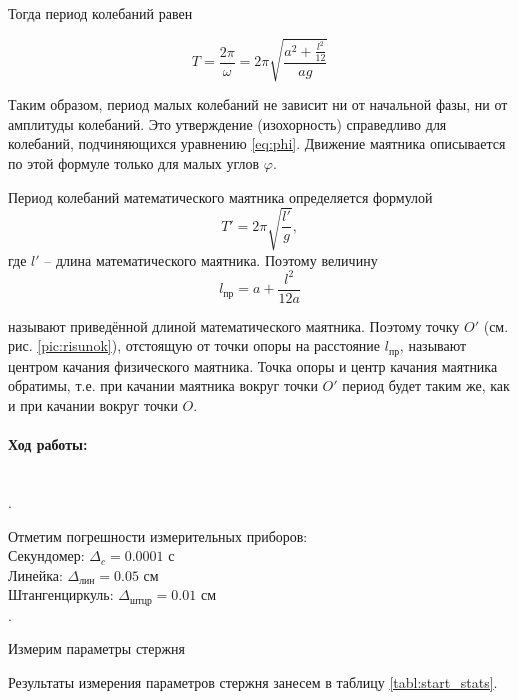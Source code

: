\documentclass[a4paper, 12pt]{article}
\newcommand{\parag}[1]{\paragraph*{#1:}}
\newcounter{Points}
\newcommand{\point}{\noindent \arabic{Points}. \addtocounter{Points}{1}}
\begin{document}
Тогда период колебаний равен

\begin{equation}
    \label{period}
    T=\frac{2\pi}{\omega}=2\pi\sqrt{\frac{a^2+\frac{l^2}{12}}{ag}}
\end{equation}

Таким образом, период малых колебаний не зависит ни от начальной фазы, ни от амплитуды колебаний. Это утверждение (изохорность) справедливо для колебаний, подчиняющихся уравнению \eqref{eq:phi}. Движение маятника описывается по этой формуле только для малых углов $ \varphi $.

\medskip

Период колебаний математического маятника определяется формулой
\begin{equation}
T'=2\pi\sqrt{\frac{l'}{g}},
\end{equation}
где $ l' $ -- длина математического маятника. Поэтому величину
\begin{equation}
    \label{eq:prived}
    l_\text{пр}=a+\frac{l^2}{12a}
\end{equation}

называют приведённой длиной математического маятника. Поэтому точку $ O' $ (см. рис. \ref{pic:risunok}), отстоящую от точки опоры на расстояние $ l_\text{пр} $, называют центром качания физического маятника. Точка опоры и центр качания маятника обратимы, т.е. при качании маятника вокруг  точки $ O' $ период будет таким же, как и при качании вокруг точки $ O $.


\parag {Ход работы} ~\\
\point Отметим погрешности измерительных приборов:\\

\noindent Секундомер: $ \Delta_c = 0.0001 \text{ с}$ \\
Линейка: $ \Delta_\text{лин} = 0.05 \text{ см}$\\
Штангенциркуль: $ \Delta_\text{штцр} = 0.01 \text{ см}$\\

\noindent \point Измерим параметры стержня

Результаты измерения параметров стержня занесем в таблицу \ref{tabl:start_stats}.
\end{document}
